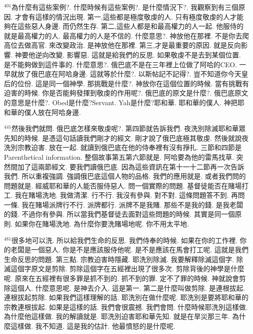 \documentclass{book}
\begin{document}
$^{401}$為什麼有這些案例?.
什麼時候有這些案例?.
是什麼情況下?.
我觀察到有三個原因.
才會有這樣的情況出現.
第一,這些都是極度敬虔的人.
只有極度敬虔的人才能夠在這些惡人身邊.
而仍然生存.
第二,這些人都是和最高權力的人一起.
他服侍的就是最高權力的人.
最高權力的人是不信的.
什麼意思?.
神放他在那裡.
不是你去爬高位去做高官.
來改變政治.
是神放他在那裡.
第三,才是最重要的原因.
就是反向影響.
神要他逆向改變.
影響惡.
這就是給我們的反思.
如果敬虔不是去到某個位置.
是不能夠做到這件事的.
什麼意思?.
俄巴底不是在三年裡上位做了阿哈的CEO.
一早就放了俄巴底在阿哈身邊.
這就等於什麼?.
以斯帖記不記得?.
豈不知道你今天皇后的位份.
這是同一個神學.
那挑戰是什麼?.
神放你在這個位置的時候.
當有挑戰有迫害的時候.
你是否能夠發揮到敬虔的作用呢?.
俄巴底的原文是什麼?.
俄巴底原文的意思是什麼?.
Obed是什麼?Servant.
Yah是什麼?耶和華.
耶和華的僕人.
神把耶和華的僕人放在阿哈身邊.

$^{441}$然後我們就問.
俄巴底怎樣來敬虔呢?.
第四節就告訴我們.
夜洗別除滅耶和華眾先知的時候.
是憑這句話讀我們剛才的經文.
剛才說了俄巴底極其敬虔.
然後就說夜洗別宗教迫害.
放在一起.
就讀到俄巴底在他的侍奉裡有沒有掙扎.
三節和四節是Parenthetical information.
整個故事第五第六節就是.
阿哈要為他的雷馬找草.
突然間加了這兩節經文.
要我們讀俄巴底.
因為這些資訊在第十一十二節再一次告訴我們.
所以重複強調.
強調俄巴底這個人物的品格.
我們的應用就是.
或者我們問的問題就是.
經威耶和華的人能否服侍惡人.
問一個實際的問題.
基督徒能否在賭場打工.
我在賭場洗地.
我做清潔.
行不行.
我沒有參與.
對不對.
這條問題答不到.
再問一條.
我在賭場派牌行不行.
派牌都行.
派牌不是我賭.
那些不是我的錢.
是我老闆的錢.
不過你有參與.
所以當我們基督徒去面對這些問題的時候.
其實是同一個原則.
如果你在賭場洗地.
為什麼你要洗賭場地呢.
你不用太平地.

$^{481}$很多地可以洗.
所以給我們生命的反思.
我們侍奉的時候.
如果在你的工作裡.
你的老闆是一個惡人.
你是不是應該服侍他呢.
是不是應該在馬會打工呢.
這就是我們生命反思的問題.
第三點.
宗教迫害時隱藏.
耶洗別除滅.
我要解釋除滅這個字.
除滅這個字原文是剪除.
剪除這個字在五經裡出現了很多次.
剪除背後的神學是什麼呢.
原來在五經裡有很多罪是抓不到的.
抓不到的罪.
定不了罪的時候.
神就說會剪除這個人.
什麼意思呢.
是神去介入.
這是第一.
第二是什麼叫做剪除.
是連根拔起.
連根拔起剪除.
如果我們這樣理解的話.
耶洗別在做什麼呢.
耶洗別是要將耶和華的宗教連根拔起.
如果是這樣的話.
我們會很震撼.
我們會問.
什麼時候耶洗別這樣做.
為什麼他這樣做.
我的解讀就是.
耶洗別迫害耶和華先知.
就是在旱災那三年.
為什麼這樣做.
我不知道.
這是我的估計.
他最憤怒的是什麼呢.
\end{document}
